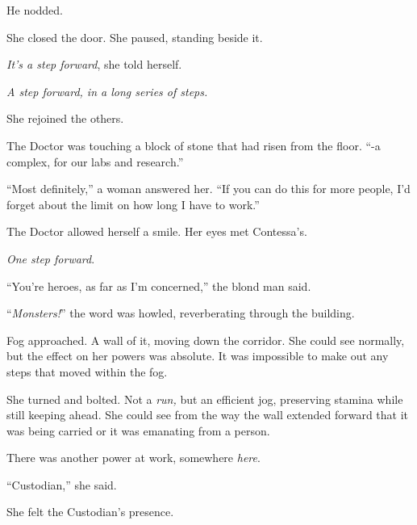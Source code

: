 He nodded.



She closed the door.  She paused, standing beside it.



\emph{It's a step forward}, she told herself.



\emph{A step forward, in a long series of steps.}



She rejoined the others.



The Doctor was touching a block of stone that had risen from the floor.  ``-a complex, for our labs and research.''



``Most definitely,'' a woman answered her.  ``If you can do this for more people, I'd forget about the limit on how long I have to work.''



The Doctor allowed herself a smile.  Her eyes met Contessa's.



\emph{One step forward}.



``You're heroes, as far as I'm concerned,'' the blond man said.



\sectionbreak



``\emph{Monsters!}'' the word was howled, reverberating through the building.



Fog approached.  A wall of it, moving down the corridor.  She could see normally, but the effect on her powers was absolute.  It was impossible to make out any steps that moved within the fog.



She turned and bolted.  Not a \emph{run,} but an efficient jog, preserving stamina while still keeping ahead.  She could see from the way the wall extended forward that it was being carried or it was emanating from a person.



There was another power at work, somewhere \emph{here}.



``Custodian,'' she said.



She felt the Custodian's presence.



